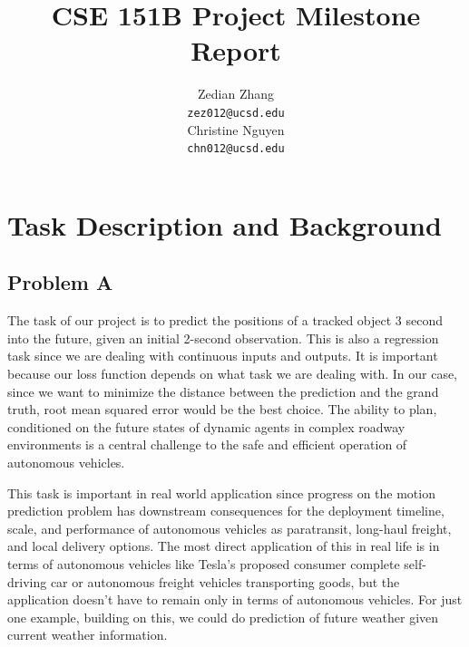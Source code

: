 \documentclass{article}
\title{CSE 151B Project Milestone Report}
\author{\AND
  Zedian Zhang\\
  \texttt{zez012@ucsd.edu} \\
  \AND
  Christine Nguyen\\
  \texttt{chn012@ucsd.edu} \\
}
\begin{document}



\maketitle


\section{Task Description and Background}

\subsection{Problem A}

The task of our project is to predict the positions of a tracked object 3 second into the future, given an initial 2-second observation. This is also a regression task since we are dealing with continuous inputs and outputs. It is important because our loss function depends on what task we are dealing with. In our case, since we want to minimize the distance between the prediction and the grand truth, root mean squared error would be the best choice. The ability to plan, conditioned on the future states of dynamic agents in complex roadway environments is a central challenge to the safe and efficient operation of autonomous vehicles. 

This task is important in real world application since progress on the motion prediction problem has downstream consequences for the deployment timeline, scale, and performance of autonomous vehicles as paratransit, long-haul freight, and local delivery options. The most direct application of this in real life is in terms of autonomous vehicles like Tesla's proposed consumer complete self-driving car or autonomous freight vehicles transporting goods, but the  application doesn't have to remain only in terms of autonomous vehicles. For just one example, building on this, we could do prediction of future weather given current weather information. 
\end{document}
